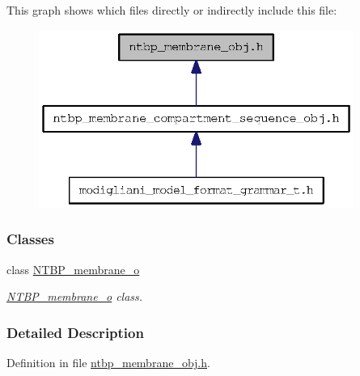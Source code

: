 This graph shows which files directly or indirectly include this file:
\nopagebreak
\begin{figure}[H]
\begin{center}
\leavevmode
\includegraphics[width=292pt]{ntbp__membrane__obj_8h__dep__incl}
\end{center}
\end{figure}
\subsubsection*{Classes}
\begin{DoxyCompactItemize}
\item 
class \hyperlink{class_n_t_b_p__membrane__o}{NTBP\_\-membrane\_\-o}
\begin{DoxyCompactList}\small\item\em \hyperlink{class_n_t_b_p__membrane__o}{NTBP\_\-membrane\_\-o} class. \item\end{DoxyCompactList}\end{DoxyCompactItemize}


\subsubsection{Detailed Description}


Definition in file \hyperlink{ntbp__membrane__obj_8h_source}{ntbp\_\-membrane\_\-obj.h}.

